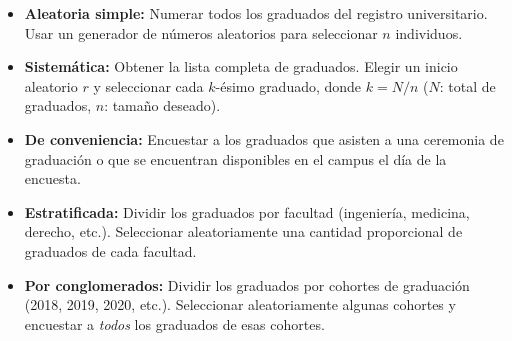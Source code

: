 \documentclass[a4paper]{article}
\begin{document}
\begin{itemize}
    \item \textbf{Aleatoria simple:} Numerar todos los graduados del registro universitario. Usar un generador de números aleatorios para seleccionar $n$ individuos.

    \item \textbf{Sistemática:} Obtener la lista completa de graduados. Elegir un inicio aleatorio $r$ y seleccionar cada $k$-ésimo graduado, donde $k = N/n$ ($N$: total de graduados, $n$: tamaño deseado).

    \item \textbf{De conveniencia:} Encuestar a los graduados que asisten a una ceremonia de graduación o que se encuentran disponibles en el campus el día de la encuesta.

    \item \textbf{Estratificada:} Dividir los graduados por facultad (ingeniería, medicina, derecho, etc.). Seleccionar aleatoriamente una cantidad proporcional de graduados de cada facultad.

    \item \textbf{Por conglomerados:} Dividir los graduados por cohortes de graduación (2018, 2019, 2020, etc.). Seleccionar aleatoriamente algunas cohortes y encuestar a \textit{todos} los graduados de esas cohortes.
\end{itemize}
\end{document}

